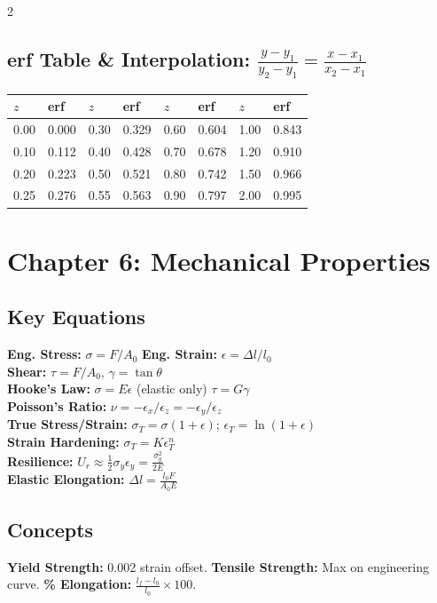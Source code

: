 \documentclass[8pt]{extarticle}
\begin{document}
\begin{multicols*}{2}
\subsection*{erf Table \& Interpolation: $\frac{y-y_1}{y_2-y_1}=\frac{x-x_1}{x_2-x_1}$}
{\scriptsize
\begin{tabular}{@{}ll@{\ }ll@{\ }ll@{\ }ll@{}}
\toprule
$z$ & erf & $z$ & erf & $z$ & erf & $z$ & erf\\
\midrule
0.00&0.000 & 0.30&0.329 & 0.60&0.604 & 1.00&0.843\\
0.10&0.112 & 0.40&0.428 & 0.70&0.678 & 1.20&0.910\\
0.20&0.223 & 0.50&0.521 & 0.80&0.742 & 1.50&0.966\\
0.25&0.276 & 0.55&0.563 & 0.90&0.797 & 2.00&0.995\\
\bottomrule
\end{tabular}}

\section*{Chapter 6: Mechanical Properties}
\subsection*{Key Equations}
\textbf{Eng. Stress:} $\sigma=F/A_0$ \quad \textbf{Eng. Strain:} $\epsilon=\Delta l/l_0$ \\
\textbf{Shear:} $\tau=F/A_0$, \; $\gamma=\tan\theta$ \\
\textbf{Hooke's Law:} $\sigma=E\epsilon$ \; (elastic only) \quad $\tau=G\gamma$ \\
\textbf{Poisson's Ratio:} $\nu=-\epsilon_x/\epsilon_z = -\epsilon_y/\epsilon_z$ \\
\textbf{True Stress/Strain:} $\sigma_T=\sigma(1+\epsilon)$; \; $\epsilon_T=\ln(1+\epsilon)$ \\
\textbf{Strain Hardening:} $\sigma_T=K\epsilon_T^n$ \\
\textbf{Resilience:} $U_r\approx\frac{1}{2}\sigma_y\epsilon_y=\frac{\sigma_y^2}{2E}$ \\
\textbf{Elastic Elongation:} $\Delta l = \frac{l_0 F}{A_0 E}$
\subsection*{Concepts}
\textbf{Yield Strength:} 0.002 strain offset. \textbf{Tensile Strength:} Max on engineering curve. \textbf{\% Elongation:} $\frac{l_f-l_0}{l_0}\times100$.


\end{multicols*}
\end{document}
